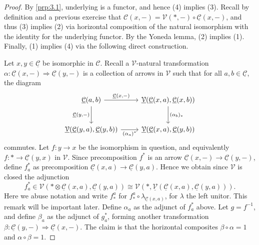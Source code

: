 \begin{proof}
	By \cref{prp:3.1}, underlying is a functor, and hence (4) implies (3). Recall by definition and a previous exercise that $\mathcal{C} (x,-)=\mathcal{V} (*,-)\circ \underline{\mathcal{C} } (x,-)$, and thus (3) implies (2) via horizontal composition of the natural isomorphism with the identity for the underlying functor. By the Yoneda lemma, (2) implies (1). Finally, (1) implies (4) via the following direct construction.

	Let $x,y\in \underline{\mathcal{C} } $ be isomorphic in $\mathcal{C} $. Recall a $\mathcal{V} $-natural transformation $\alpha : \underline{\mathcal{C} } (x,-) \Rightarrow \underline{\mathcal{C} } (y,-)$ is a collection of arrows in $\mathcal{V} $ such that for all $a,b\in\underline{\mathcal{C} } $, the diagram
	\[\begin{tikzcd}[row sep = 2.5em, column sep = 2.5em]
	\underline{\mathcal{C} } (a,b)\ar[" \underline{\mathcal{C} } (x\text{,} -) ", r] \ar[" \underline{\mathcal{C} } (y\text{,} -) "', d]  & \underline{\mathcal{V} } (\underline{\mathcal{C} } (x,a),\underline{\mathcal{C} } (x,b))\ar[" (\alpha_b)_* ", d]  \\
	\underline{\mathcal{V} } (\underline{\mathcal{C} } (y,a),\underline{\mathcal{C} } (y,b))\ar[" (\alpha_a)^* "', r]  & \underline{\mathcal{V} } (\underline{\mathcal{C} } (x,a),\underline{\mathcal{C} } (y,b))
	\end{tikzcd}\]
	commutes. Let $f : y \to x$ be the isomorphism in question, and equivalently $f : * \to \underline{\mathcal{C} } (y,x)$ in $\mathcal{V} $. Since precomposition $f^*$ is an arrow $\underline{\mathcal{C} } (x,-)\to \underline{\mathcal{C} } (y,-)$, define $f_a^*$ as precomposition $\underline{\mathcal{C} } (x,a)\to \underline{\mathcal{C} } (y,a)$. Hence we obtain since $\mathcal{V} $ is closed the adjunction
	\[
		f^*_a\in \mathcal{V}(*\otimes \underline{\mathcal{C} } (x,a),\underline{\mathcal{C} } (y,a))\cong \mathcal{V} (*,\underline{\mathcal{V} } (\underline{\mathcal{C} } (x,a),\underline{\mathcal{C} } (y,a)))
	.\]
	Here we abuse notation and write $f_*^a$ for $f_*^a\circ \lambda_{\underline{\mathcal{C} } (x,a)} $, for $\lambda$ the left unitor. This remark will be important later. Define $\alpha_a$ as the adjunct of $f^*_a$ above. Let $g=f^{-1} $, and define $\beta_a$ as the adjunct of $g_a^*$, forming another transformation $\beta : \underline{\mathcal{C} } (y,-) \Rightarrow \underline{\mathcal{C} } (x,-)$. The claim is that the horizontal composites $\beta\circ \alpha=1$ and $\alpha\circ \beta=1$.


\end{proof}

